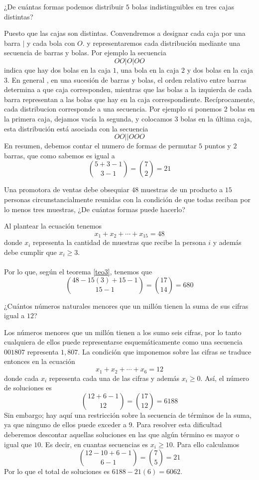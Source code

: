 \begin{ejemplo}
¿De cuántas formas podemos distribuir $5$ bolas indistinguibles en tres cajas distintas?
\end{ejemplo}
\begin{solucion}
Puesto que las cajas son distintas. Convendremos a designar cada caja por una barra $|$ y cada bola con $O$. y representaremos cada distribución mediante una secuencia de barras y bolas. Por ejemplo la secuencia
\[OO|O|OO\]
indica  que  hay  dos  bolas  en  la  caja  $1$,  una  bola  en  la  caja  $2$ y dos  bolas  en  la  caja  $3$. En  general  ,  en  una  sucesión  de  barras y  bolas,  el  orden  relativo  entre  barras  determina  a  que  caja  corresponden,  mientras  que  las bolas  a  la  izquierda  de  cada barra  representan  a  las  bolas  que  hay  en  la  caja  correspondiente. Recíprocamente, cada distribucion corresponde a una secuencia.  Por ejemplo  si  ponemos  2  bolas  en  la  primera  caja,  dejamos  vacía  la segunda,  y  colocamos  3  bolas  en  la  última  caja,  esta  distribución está asociada con la secuencia
\[OO||OOO\]
En resumen, debemos contar el numero de formas de permutar $5$ puntos y $2$ barras, que como sabemos es igual a
\[\binom{5+3-1}{3-1}=\binom{7}{2}=21\]
\end{solucion}
\begin{ejemplo}
Una promotora de ventas debe obsequiar $48$ muestras de un producto a $15$ personas circunstancialmente reunidas con la condición de que todas reciban por lo menos tres muestras, ¿De cuántas formas puede hacerlo?
\end{ejemplo}
\begin{solucion}
Al plantear la ecuación tenemos
\[x_1+x_2+\cdots+x_{15}=48\]
donde $x_i$ representa la cantidad de muestras que recibe la persona $i$ y además debe cumplir que $x_i\geq 3$.\\\\
Por lo que, según el teorema \ref{teo3}, tenemos que 
\[\binom{48-15(3)+15-1}{15-1}=\binom{17}{14}=680\]
\end{solucion}
\begin{ejemplo}
 ¿Cuántos números naturales menores que un millón tienen la suma de sus cifras igual a $12$?   
\end{ejemplo}
\begin{solucion}
Los números menores que un millón tienen a los sumo seis cifras, por lo  tanto  cualquiera  de  ellos  puede  representarse  esquemáticamente como  una  secuencia  $001807$  representa  $1,807$. La  condición  que imponemos sobre las cifras se traduce entonces en la ecuación
\[x_1+x_2+\cdots+x_6=12\]
donde cada $x_i$ representa cada una de las cifras y además $x_i\geq 0$. Así, el número de soluciones es
\[\binom{12+6-1}{12}=\binom{17}{12}=6188\]
Sin  embargo;  hay  aquí  una  restricción  sobre  la  secuencia  de  términos  de  la  suma,  ya  que  ninguno  de  ellos  puede  exceder  a  $9$.   Para resolver  esta  dificultad  deberemos  descontar  aquellas  soluciones  en las que algún término es mayor o igual que $10$.  Es decir, en cuantas secuencias es $x_i\geq 10$. Para ello calculamos
\[\binom{12-10+6-1}{6-1}=\binom{7}{5}=21\]
Por lo que el total de soluciones es $6188-21(6)=6062$.
\end{solucion}
